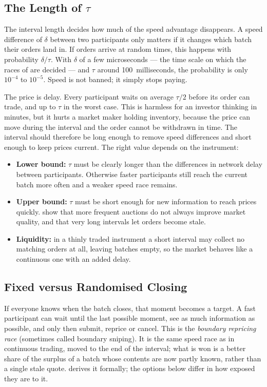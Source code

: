 \subsection{The Length of \texorpdfstring{$\tau$}{tau}}

The interval length decides how much of the speed advantage disappears. A
speed difference of $\delta$ between two participants only matters if it
changes which batch their orders land in. If orders arrive at random times,
this happens with probability $\delta/\tau$. With $\delta$ of a few
microseconds --- the time scale on which the races of
\citet{aquilina2022quantifying} are decided --- and $\tau$ around
100~milliseconds, the probability is only $10^{-4}$ to $10^{-5}$. Speed is not
banned; it simply stops paying.

The price is delay. Every participant waits on average $\tau/2$ before its
order can trade, and up to $\tau$ in the worst case. This is harmless for an
investor thinking in minutes, but it hurts a market maker holding inventory,
because the price can move during the interval and the order cannot be
withdrawn in time. The interval should therefore be long enough to remove
speed differences and short enough to keep prices current. The right value
depends on the instrument:

\begin{itemize}
  \item \textbf{Lower bound:} $\tau$ must be clearly longer than the
  differences in network delay between participants. Otherwise faster
  participants still reach the current batch more often and a weaker speed
  race remains.
  \item \textbf{Upper bound:} $\tau$ must be short enough for new information
  to reach prices quickly. \citet{zoican2021speed} show that more frequent
  auctions do not always improve market quality, and that very long intervals
  let orders become stale.
  \item \textbf{Liquidity:} in a thinly traded instrument a short interval may
  collect no matching orders at all, leaving batches empty, so the market
  behaves like a continuous one with an added delay.
\end{itemize}

\subsection{Fixed versus Randomised Closing}

If everyone knows when the batch closes, that moment becomes a target. A fast
participant can wait until the last possible moment, see as much information
as possible, and only then submit, reprice or cancel. This is the
\emph{boundary repricing race} (sometimes called boundary sniping). It is the
same speed race as in continuous trading, moved to the end of the interval;
what is won is a better share of the surplus of a batch whose contents are
now partly known, rather than a single stale quote. 
derives it formally; the options below differ in how exposed they are to it.

